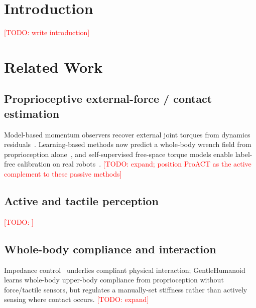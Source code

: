 \documentclass[conference]{IEEEtran}
\newcommand{\todo}[1]{\textcolor{red}{[TODO: #1]}}
\begin{document}
\section{Introduction}
\todo{write introduction}

\section{Related Work}
\subsection{Proprioceptive external-force / contact estimation}
Model-based momentum observers recover external joint torques from dynamics
residuals~\cite{deluca2006momentum}. Learning-based methods now predict a
whole-body wrench field from proprioception alone~\cite{sixthsense}, and
self-supervised free-space torque models enable label-free calibration on real
robots~\cite{next}.
\todo{expand; position ProACT as the active complement to these passive methods}

\subsection{Active and tactile perception}
\todo{}

\subsection{Whole-body compliance and interaction}
Impedance control~\cite{hogan1985impedance} underlies compliant physical
interaction; GentleHumanoid~\cite{gentlehumanoid} learns whole-body upper-body
compliance from proprioception without force/tactile sensors, but regulates a
manually-set stiffness rather than actively sensing where contact occurs.
\todo{expand}
\end{document}
